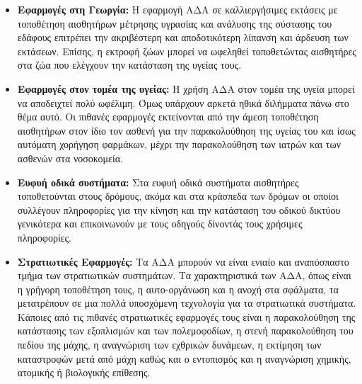 \begin{itemize}
\item \textbf{Εφαρμογές στη Γεωργία:} Η εφαρμογή ΑΔΑ σε καλλιεργήσιμες εκτάσεις με τοποθέτηση αισθητήρων μέτρησης υγρασίας και ανάλυσης της σύστασης του
εδάφους επιτρέπει την ακριβέστερη και αποδοτικότερη λίπανση και άρδευση των εκτάσεων.
Επίσης, η εκτροφή ζώων μπορεί να ωφεληθεί τοποθετώντας αισθητήρες στα ζώα που ελέγχουν την κατάσταση της υγείας τους.
\item \textbf{Εφαρμογές στον τομέα της υγείας:} Η χρήση ΑΔΑ στον τομέα της υγεία μπορεί να αποδειχτεί πολύ ωφέλιμη.
Όμως υπάρχουν αρκετά ηθικά διλήμματα πάνω στο θέμα αυτό.
Οι πιθανές εφαρμογές εκτείνονται από την άμεση τοποθέτηση αισθητήρων στον ίδιο τον ασθενή για την παρακολούθηση της υγείας του και ίσως αυτόματη χορήγηση φαρμάκων,
μέχρι την παρακολούθηση των ιατρών και των ασθενών στα νοσοκομεία.
\item \textbf{Ευφυή οδικά συστήματα:} Στα ευφυή οδικά συστήματα αισθητήρες τοποθετούνται στους δρόμους, ακόμα και στα κράσπεδα των δρόμων οι οποίοι
συλλέγουν πληροφορίες για την κίνηση και την κατάσταση του οδικού δικτύου γενικότερα και επικοινωνούν με τους οδηγούς δίνοντάς τους χρήσιμες πληροφορίες.
\item \textbf{Στρατιωτικές Εφαρμογές:} Τα ΑΔΑ μπορούν να είναι ενιαίο και αναπόσπαστο τμήμα των στρατιωτικών συστημάτων.
Τα χαρακτηριστικά των ΑΔΑ, όπως είναι η γρήγορη τοποθέτηση τους, η αυτο-οργάνωση και η ανοχή στα σφάλματα, τα μετατρέπουν σε μια πολλά υποσχόμενη τεχνολογία για τα
στρατιωτικά συστήματα.
Κάποιες από τις πιθανές στρατιωτικές εφαρμογές τους είναι η παρακολούθηση της κατάστασης των εξοπλισμών και των πολεμοφοδίων, η στενή παρακολούθηση του πεδίου της
μάχης, η αναγνώριση των εχθρικών δυνάμεων, η εκτίμηση των καταστροφών μετά από μάχη καθώς και ο εντοπισμός και η αναγνώριση χημικής, ατομικής ή βιολογικής επίθεσης.
\end{itemize}



